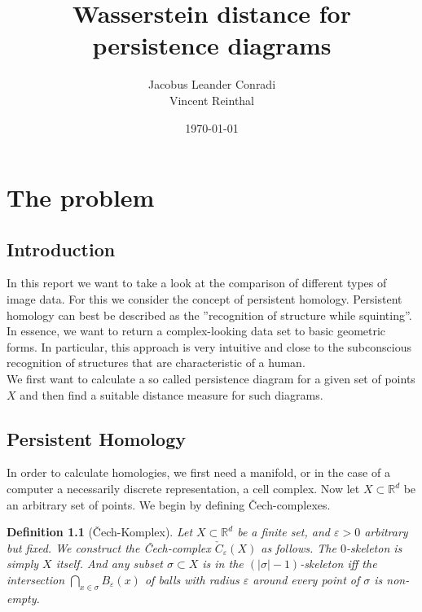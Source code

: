 \documentclass[11pt, a4paper,draft]{report}
\author{Jacobus Leander Conradi\\Vincent Reinthal}
\date{\today}
\title{Wasserstein distance for persistence diagrams}
\newtheorem{definition}{Definition}
\newcommand{\bR}{\mathbb{R}}
\begin{document}
    \maketitle

    \thispagestyle{plain}
    \addtocounter{page}{-1}
    \tableofcontents
    \vfil\null
    \clearpage
    \thispagestyle{empty}\mbox{}
    \clearpage

    \chapter{The problem}\label{ch:the-problem}
    \section{Introduction}\label{sec:introduction}
    In this report we want to take a look at the comparison of different types of image data.
    For this we consider the concept of persistent homology.
    Persistent homology can best be described as the ''recognition of structure while squinting''.
    In essence, we want to return a complex-looking data set to basic geometric forms.
    In particular, this approach is very intuitive and close to the subconscious recognition of structures that are characteristic of a human.\\
    We first want to calculate a so called persistence diagram for a given set of points $X$ and then find a suitable distance measure for such diagrams.


    \section{Persistent Homology}\label{sec:persistent-homology}

    In order to calculate homologies, we first need a manifold, or in the case of a computer a necessarily discrete representation, a cell complex.
    Now let $X\subset \bR^d$ be an arbitrary set of points.
    We begin by defining Čech-complexes.

    \begin{definition}[Čech-Komplex]
        Let $X\subset \bR^d$ be a finite set, and $\varepsilon>0$ arbitrary but fixed.
        We construct the Čech-complex $\check C_\varepsilon(X)$ as follows.
        The $0$-skeleton is simply $X$ itself.
        And any subset $\sigma\subset X$ is in the $(|\sigma|-1)$-skeleton iff the intersection $\bigcap_{x\in\sigma}B_\varepsilon(x)$ of balls with radius $\varepsilon$ around every point of $\sigma$ is non-empty.
    \end{definition}
\end{document}
